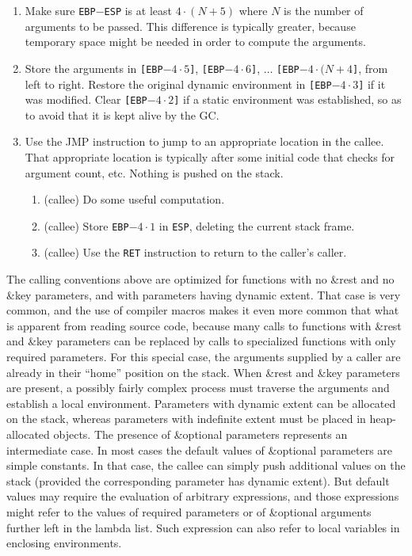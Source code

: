 \begin{enumerate}
\item Make sure \texttt{EBP}$-$\texttt{ESP} is at least $4 \cdot (N +
  5)$ where $N$ is the number of arguments to be passed.  This
  difference is typically greater, because temporary space might be
  needed in order to compute the arguments.
\item Store the arguments in 
  \texttt{[EBP$- 4 \cdot 5$]}, 
  \texttt{[EBP$- 4 \cdot 6$]}, 
  $\ldots$
  \texttt{[EBP$- 4 \cdot (N + 4$]},
  from left to right.
  Restore the original dynamic environment in 
  \texttt{[EBP$- 4 \cdot 3$]}
  if it was modified.  Clear 
  \texttt{[EBP$- 4 \cdot 2$]} if a static environment was
  established, so as to avoid that it is kept alive by the GC.
\item Use the JMP instruction to jump to an appropriate location in
  the callee.  That appropriate location is typically after some
  initial code that checks for argument count, etc.  Nothing is pushed
  on the stack.
  \begin{enumerate}
  \item (callee) Do some useful computation.
  \item (callee) Store \texttt{EBP$- 4 \cdot 1$} in \texttt{ESP},
    deleting the current stack frame.
  \item (callee) Use the \texttt{RET} instruction to return to the
    caller's caller.
  \end{enumerate}
\end{enumerate}

The calling conventions above are optimized for functions with no
\&rest and no \&key parameters, and with parameters having dynamic
extent.  That case is very common, and the use of compiler macros
makes it even more common that what is apparent from reading source
code, because many calls to functions with \&rest and \&key parameters
can be replaced by calls to specialized functions with only required
parameters.  For this special case, the arguments supplied by a caller
are already in their ``home'' position on the stack.  When \&rest and
\&key parameters are present, a possibly fairly complex process must
traverse the arguments and establish a local environment.  Parameters
with dynamic extent can be allocated on the stack, whereas parameters
with indefinite extent must be placed in heap-allocated objects.
  The presence of
\&optional parameters represents an intermediate case.  In most cases
the default values of \&optional parameters are simple constants.  In
that case, the callee can simply push additional values on the stack
(provided the corresponding parameter has dynamic extent).  But
default values may require the evaluation of arbitrary expressions,
and those expressions might refer to the values of required parameters
or of \&optional arguments further left in the lambda list.  Such
expression can also refer to local variables in enclosing
environments.  

